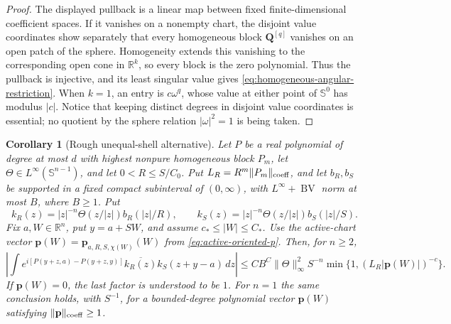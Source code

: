 \documentclass[11pt]{article}
\numberwithin{equation}{section}
\newtheorem{corollary}[theorem]{Corollary}
\theoremstyle{remark}
\theoremstyle{definition}
\newcommand{\R}{\mathbb R}
\newcommand{\Sph}{\mathbb S}
\newcommand{\norm}[1]{\lVert #1\rVert}
\newcommand{\abs}[1]{\lvert #1\rvert}
\newcommand{\BV}{\operatorname{BV}}
\begin{document}
\begin{proof}
The displayed pullback is a linear map between fixed finite-dimensional
coefficient spaces.  If it vanishes on a nonempty chart, the disjoint
value coordinates show separately that every homogeneous block
$\mathbf Q^{[q]}$ vanishes on an open patch of the sphere.  Homogeneity
extends this vanishing to the corresponding open cone in $\R^k$, so every
block is the zero polynomial.  Thus the pullback is injective, and its
least singular value gives \eqref{eq:homogeneous-angular-restriction}.
When $k=1$, an entry is $c\omega^q$, whose value at either point of
$\Sph^0$ has modulus $|c|$.  Notice that keeping distinct degrees in
disjoint value coordinates is essential; no quotient by the sphere
relation $|\omega|^2=1$ is being taken.
\end{proof}

\begin{corollary}[Rough unequal-shell alternative]
\label{cor:unequal-correlation}
Let $P$ be a real polynomial of degree at most $d$ with highest nonpure
homogeneous block $P_m$, let
$\Theta\in L^\infty(\Sph^{n-1})$, and let \(0<R\le S/C_0\).  Put
$L_R=R^m\norm{P_m}_{\rm coeff}$, and let \(b_R,b_S\) be supported in a fixed compact
subinterval of \((0,\infty)\), with
\(L^\infty+\BV\) norm at most \(B\), where \(B\ge1\).  Put
\[
 k_R(z)=|z|^{-n}\Theta(z/|z|)b_R(|z|/R),\qquad
 k_S(z)=|z|^{-n}\Theta(z/|z|)b_S(|z|/S).
\]
Fix $a,W\in\R^n$, put \(y=a+SW\), and assume
\(c_*\le|W|\le C_*\).  Use the active-chart vector
\(\mathbf p(W)=\mathbf p_{a,R,S,\chi(W)}(W)\) from
\eqref{eq:active-oriented-p}.  Then, for \(n\ge2\),
\begin{equation}\label{eq:unequal-correlation}
 \left|\int e^{i[P(y+z,a)-P(y+z,y)]}
 \overline{k_R(z)}k_S(z+y-a)\,dz\right|
 \le CB^C\norm\Theta_\infty^2S^{-n}
 \min\{1,(L_R\abs{\mathbf p(W)})^{-c}\}.
\end{equation}
If \(\mathbf p(W)=0\), the last factor is understood to be \(1\).
For \(n=1\) the same conclusion holds, with \(S^{-1}\), for a
bounded-degree polynomial vector \(\mathbf p(W)\) satisfying
\(\norm{\mathbf p}_{\rm coeff}\ge1\).
\end{corollary}
\end{document}
